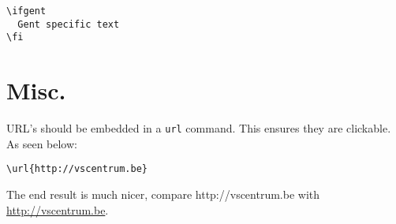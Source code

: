 \documentclass[11pt,a4paper]{article}
\begin{document}
\begin{verbatim}
\ifgent
  Gent specific text
\fi
\end{verbatim}

\section{Misc.}
\label{sec:misc}

URL's should be embedded in a \texttt{url} command. This ensures they are clickable. As seen below:
\begin{verbatim}
\url{http://vscentrum.be}
\end{verbatim}

The end result is much nicer, compare http://vscentrum.be with \url{http://vscentrum.be}.
\end{document}
